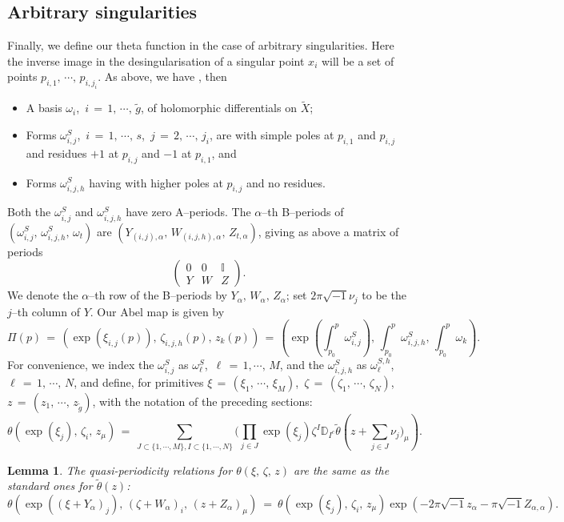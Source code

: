 \documentclass[12pt,reqno]{amsart}
\numberwithin{equation}{section}
\newtheorem{lemma}[theorem]{Lemma}
\theoremstyle{definition}
\theoremstyle{remark}
\def\bD{{\mathbb {D}}}
\def\bI{{\mathbb {I}}}
\def\bD{{\mathbb {D}}}
\begin{document}
\subsection{Arbitrary singularities} 

Finally, we define our theta function in the case of arbitrary singularities. Here the inverse image in the desingularisation of a
singular point $x_i$ will be a set of points $p_{i,1},\, \cdots ,\,p_{i,j_i}$. As above, we have , then
\begin{itemize}
\item A basis
$\omega_i$,\, $i\,=\,1,\, \cdots ,\,\widetilde g$, of holomorphic differentials on $\widetilde X$; 
\item Forms $\omega^S_{i, j}$,\, $i\,=\,1,\, \cdots ,\,s$,\, $j\,=\, 2,\,\cdots ,\,j_i$, are   with simple poles
at $p_{i, 1}$ and $p_{i, j}$ and residues $+1$ at $p_{i, j}$ and $-1$ at $p_{i,1}$, and

\item Forms $\omega_{i,j,h}^{S}$ having   with higher poles at $p_{i,j}$ and no residues.
\end{itemize}
Both the $\omega^S_{i, j}$ and $\omega_{i,j,h}^{S}$ have zero A--periods. The $\alpha$--th B--periods of
$(\omega^S_{i, j},\,\omega_{i,j,h}^{S},\, \omega_t)$ are $(Y_{(i,j), \alpha},\, W_{(i,j,h),\alpha},\, Z_{t,\alpha})$,
giving as above a matrix of periods
$$\begin{pmatrix} 0&0&\bI\\Y& W& Z\end{pmatrix}. $$
We denote  the $\alpha$--th row of the B--periods by  $Y_\alpha,\, W_\alpha,\, Z_\alpha $; set
$2\pi\sqrt{-1} \nu_j$ to be the $j$--th column of $Y$.
Our Abel map is given by 
$$ \Pi(p)\, =\, (\exp(\xi_{i, j}(p)),\,\zeta_{i,j,h }(p),\,z_k(p))\, =\,( \exp( \int_{p_0}^p  \omega^S_{i, j}),
\, \int_{p_0}^p\omega_{i,j,h}^{S},\, \int_{p_0}^p\omega_k ).$$
For convenience, we index  the $\omega^S_{i, j}$ as  $\omega^S_{\ell}$,\, $\ell\,=\, 1,\cdots ,\,M$,
and the  $\omega_{i,j,h}^{S}$ as  $\omega_\ell^{S,h }$,\, $\ell\, =\, 1,\,\cdots ,\,N$, and define,
for primitives $\xi \,=\, (\xi_1,\, \cdots ,\,\xi_M)$,\, $\zeta \,=\, (\zeta_1,\,\cdots,\, \zeta_N)$,\,
$z\,=\, (z_1,\,\cdots ,\,z_{\widetilde g})$, with the notation of the preceding sections:
$$\theta(\exp(\xi_j),\, \zeta_i,\, z_\mu) \,=\, \sum_{J \subset \{1,\cdots ,M\}, I\subset\{1,\cdots ,N\}}
(\prod_{j\in J} \exp( \xi_j )\zeta^I\bD_{I^c}\widetilde{\theta} (z +\sum_{j\in J}{\nu_j)_\mu}).$$

\begin{lemma}
The quasi-periodicity relations for $\theta(\xi,\, \zeta,\, z)$ are the same as the standard ones for
$\widetilde{\theta} (z)$:
$$ \theta(\exp((\xi +Y_\alpha)_j),\, (\zeta +W_\alpha)_i,\, (z + Z_\alpha)_\mu)\ =\
\theta(\exp(\xi_j),\, \zeta_i,\, z_\mu) \exp (-2\pi\sqrt{-1} z_\alpha -\pi\sqrt{-1} Z_{\alpha,\alpha}).$$
\end{lemma}
\end{document}
